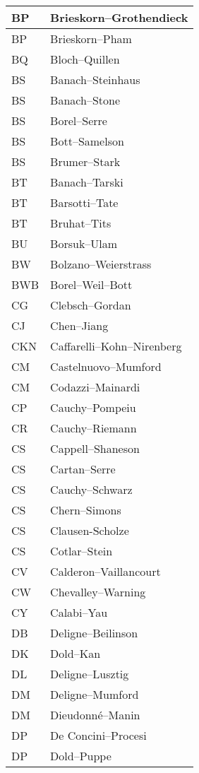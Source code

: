 \documentclass{amsart}
\numberwithin{equation}{section}
\theoremstyle{plain}
\numberwithin{equation}{section}
\theoremstyle{remark}
\begin{document}
\begin{multicols}{2}
{\begin{longtable}{l|l}
BP & Brieskorn--Grothendieck\\ \hline
BP & Brieskorn--Pham\\ \hline
BQ & Bloch--Quillen\\ \hline
BS & Banach--Steinhaus\\ \hline
BS & Banach--Stone\\ \hline
BS & Borel--Serre\\ \hline
BS & Bott--Samelson\\ \hline
BS & Brumer--Stark\\ \hline
BT & Banach--Tarski\\ \hline
BT & Barsotti--Tate\\ \hline
BT & Bruhat--Tits\\ \hline
BU & Borsuk--Ulam\\ \hline
BW & Bolzano--Weierstrass\\ \hline
BWB & Borel--Weil--Bott\\ \hline
CG & Clebsch--Gordan\\ \hline
CJ & Chen--Jiang\\ \hline
CKN & Caffarelli--Kohn--Nirenberg\\ \hline
CM & Castelnuovo--Mumford\\ \hline
CM & Codazzi--Mainardi\\ \hline
CP &  Cauchy--Pompeiu\\ \hline
CR & Cauchy--Riemann\\ \hline
CS & Cappell--Shaneson\\ \hline
CS & Cartan--Serre\\ \hline
CS & Cauchy--Schwarz\\ \hline
CS & Chern--Simons\\ \hline
CS & Clausen-Scholze\\ \hline
CS & Cotlar--Stein\\ \hline
CV & Calderon--Vaillancourt\\ \hline
CW & Chevalley--Warning\\ \hline
CY & Calabi--Yau\\ \hline
DB & Deligne--Beilinson\\ \hline
DK & Dold--Kan\\ \hline
DL & Deligne--Lusztig\\ \hline
DM & Deligne--Mumford\\ \hline
DM & Dieudonné--Manin\\ \hline
DP & De Concini--Procesi\\ \hline
DP & Dold--Puppe\\ \hline

\end{longtable}}
\end{multicols}
\end{document}
